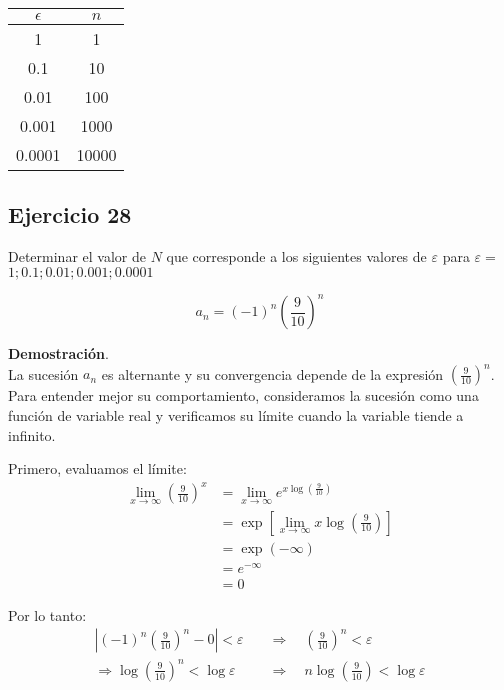 \documentclass{article}
\begin{document}
    \begin{center}
    \begin{tabular}{c|c}
    $\epsilon$ & $n$ \\
    \hline
    1 & 1 \\
    \hline
    0.1 & 10 \\
    \hline
    0.01 & 100 \\
    \hline
    0.001 & 1000 \\
    \hline
    0.0001 & 10000 \\
    \end{tabular}
    \end{center}



    \subsection*{Ejercicio 28}

    Determinar el valor de $N$ que corresponde a los siguientes valores de $\varepsilon$ para $\varepsilon=$ $1; 0.1; 0.01; 0.001; 0.0001$

    $$
    a_{n} = (-1)^{n}\left(\frac{9}{10}\right)^{n}
    $$

    \textbf{Demostración}.\\

    La sucesión $a_{n}$ es alternante y su convergencia depende de la expresión $\left(\frac{9}{10}\right)^{n}$. Para entender mejor su comportamiento, consideramos la sucesión como una función de variable real y verificamos su límite cuando la variable tiende a infinito.

    Primero, evaluamos el límite:
    \begin{align*}
    \lim_{x \rightarrow \infty} \left(\frac{9}{10}\right)^{x} &= \lim_{x \rightarrow \infty} e^{x \log \left(\frac{9}{10}\right)} \\
    &= \exp \left[ \lim_{x \rightarrow \infty} x \log \left(\frac{9}{10}\right) \right] \\
    &= \exp(-\infty) \\
    &= e^{-\infty} \\
    &= 0
    \end{align*}

    Por lo tanto:
    \begin{align*}
    \left| (-1)^{n}\left(\frac{9}{10}\right)^{n} - 0 \right| < \varepsilon \quad &\Rightarrow \quad \left( \frac{9}{10} \right)^{n} < \varepsilon \\
    \Rightarrow \log \left( \frac{9}{10} \right)^{n} < \log \varepsilon \quad &\Rightarrow \quad n \log \left( \frac{9}{10} \right) < \log \varepsilon
    \end{align*}
\end{document}
